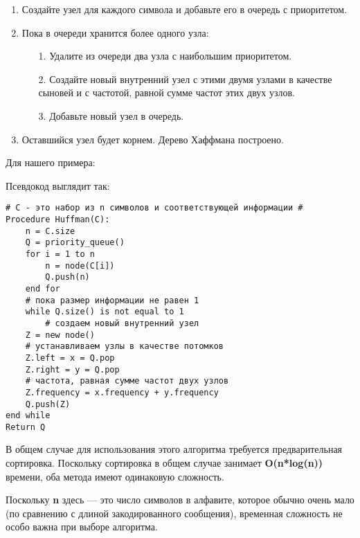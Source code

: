 \begin{enumerate} 
  \item Создайте узел для каждого символа и добавьте его в очередь с приоритетом.
  \item Пока в очереди хранится более одного узла:
    \begin{enumerate} 
        \item[1.] Удалите из очереди два узла с наибольшим приоритетом.
        \item[2.] Создайте новый внутренний узел с этими двумя узлами в качестве сыновей и с частотой, равной сумме частот этих двух узлов.
        \item[3.] Добавьте новый узел в очередь.
    \end{enumerate} 
  \item Оставшийся узел будет корнем. Дерево Хаффмана построено.
\end{enumerate}

Для нашего примера:

{}

Псевдокод выглядит так:

\vspace{\baselineskip}
\begin{tcolorbox}
\begin{verbatim}
# C - это набор из n символов и соответствующей информации #
Procedure Huffman(C):
	n = C.size
	Q = priority_queue()
	for i = 1 to n
		n = node(C[i])
		Q.push(n)
	end for
	# пока размер информации не равен 1
	while Q.size() is not equal to 1
		# создаем новый внутренний узел 
	Z = new node()
	# устанавливаем узлы в качестве потомков
	Z.left = x = Q.pop
	Z.right = y = Q.pop
	# частота, равная сумме частот двух узлов
	Z.frequency = x.frequency + y.frequency
	Q.push(Z)
end while
Return Q
\end{verbatim}
\end{tcolorbox}

\vspace{\baselineskip}
В общем случае для использования этого алгоритма требуется предварительная сортировка. Поскольку сортировка в общем случае занимает {\bfseries O(n*log(n))} времени, оба метода имеют одинаковую сложность.

\vspace{\baselineskip}
Поскольку {\bfseries n} здесь --- это число символов в алфавите, которое обычно очень мало (по сравнению с длиной закодированного сообщения), временная сложность не особо важна при выборе алгоритма.

